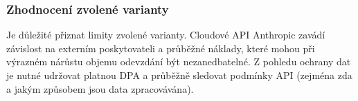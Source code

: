 \begin{table}[H]
    \centering
    \caption{Srovnání finálních kandidátů z hlediska klíčových kritérií ($\bullet$ = splňuje, $\circ$ = nesplňuje nebo nevýhoda). Hodnocení vychází z analýzy v sekcích~\ref{sec:selection-criteria}--\ref{sec:selection-models}.}
    \label{tab:final-model-comparison}
\end{table}

\subsubsection*{Zhodnocení zvolené varianty}

Je důležité přiznat limity zvolené varianty.
Cloudové API Anthropic zavádí závislost na externím poskytovateli a průběžné náklady, které mohou při výrazném nárůstu objemu odevzdání být nezanedbatelné.
Z pohledu ochrany dat je nutné udržovat platnou DPA a průběžně sledovat podmínky API (zejména zda a jakým způsobem jsou data zpracovávána).

